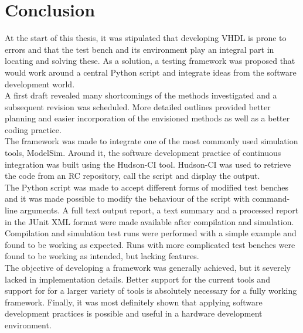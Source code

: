 \documentclass[11pt,british]{article}
\begin{document}


\newpage{}
\section{Conclusion}
At the start of this thesis, it was stipulated that developing \gls{VHDL} is prone to errors and that the test bench and its environment play an integral part in locating and solving these. As a solution, a testing framework was proposed that would work around a central Python script and integrate ideas from the software development world.
\\[\baselineskip]
A first draft revealed many shortcomings of the methods investigated and a subsequent revision was scheduled. More detailed outlines provided better planning and easier incorporation of the envisioned methods as well as a better coding practice.
\\[\baselineskip]
The framework was made to integrate one of the most commonly used simulation tools, ModelSim. Around it, the software development practice of continuous integration was built using the Hudson-CI tool. Hudson-CI was used to retrieve the code from an \gls{RC} repository, call the script and display the output.
\\[\baselineskip]
The Python script was made to accept different forms of modified test benches and it was made possible to modify the behaviour of the script with command-line arguments. A full text output report, a text summary and a processed report in the JUnit \gls{XML} format were made available after compilation and simulation.
\\[\baselineskip]
Compilation and simulation test runs were performed with a simple example and found to be working as expected. Runs with more complicated test benches were found to be working as intended, but lacking features.
\\[\baselineskip]
The objective of developing a framework was generally achieved, but it severely lacked in implementation details. Better support for the current tools and support for for a larger variety of tools is absolutely necessary for a fully working framework. Finally, it was most definitely shown that applying software development practices is possible and useful in a hardware development environment.

\end{document}
